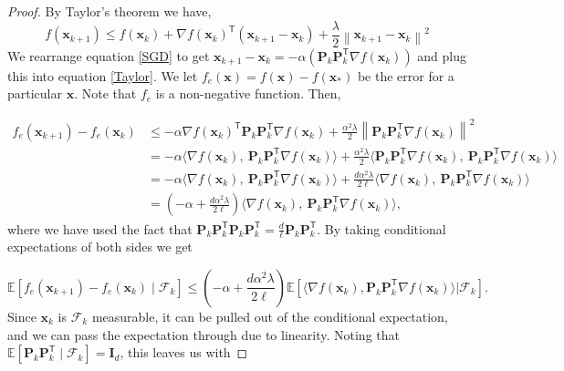 \documentclass[11pt] {article}
\newcommand{\norm}[1]{\left\lVert#1\right\rVert}
\newcommand{\x}{\pmb{x}}
\newcommand{\I}{\pmb{I}}
\newcommand{\Expectation}{\mathbb{E}}
\newcommand{\T}{\mathsf{T}}
\begin{document}
\begin{proof}
	By Taylor's theorem we have, 
	\begin{equation}\label{Taylor}
	f(\x_{k+1}) \leq  f(\x_k) + \nabla f(\x_k)^{\T}(\x_{k+1}-\x_k) + \frac{\lambda}{2}\norm{\x_{k+1}-\x_k}^2
	\end{equation}
	We rearrange equation \eqref{SGD} to get $\x_{k+1}-\x_k = -\alpha(\mathbf{P}_k\mathbf{P}_k^{\T}\nabla f(\x_k))$ and plug this into equation \eqref{Taylor}. We let $f_e(\x) = f(\x)-f(\x_*)$ be the error for a particular $\x$.  Note that $f_e$ is a non-negative function. Then,
	
	\begin{align}\label{delineq}
	\nonumber	f_e(\x_{k+1}) - f_e(\x_k)  &\leq - \alpha  \nabla f(\x_k)^{\T}\mathbf{P}_k\mathbf{P}_k^{\T} \nabla f(\x_k) + \frac{\alpha^2\lambda}{2}\norm{\mathbf{P}_k\mathbf{P}_k^{\T} \nabla f(\x_k)}^2\\
	\nonumber	&= -\alpha \langle \nabla f(\x_k),~ \mathbf{P}_k\mathbf{P}_k^{\T}\nabla f(\x_k) \rangle + \frac{\alpha^2\lambda}{2}  \langle  \mathbf{P}_k\mathbf{P}_k^{\T}\nabla f(\x_k),~ \mathbf{P}_k\mathbf{P}_k^{\T}\nabla f(\x_k) \rangle \\
	\nonumber	&= -\alpha \langle \nabla f(\x_k),~ \mathbf{P}_k\mathbf{P}_k^{\T}\nabla f(\x_k) \rangle + \frac{d\alpha^2\lambda}{2\ell}  \langle \nabla f(\x_k),~ \mathbf{P}_k\mathbf{P}_k^{\T}\nabla f(\x_k) \rangle\\
		\nonumber	&= \left(-\alpha +\frac{d\alpha^2\lambda}{2\ell}\right)  \langle \nabla f(\x_k),~ \mathbf{P}_k\mathbf{P}_k^{\T}\nabla f(\x_k) \rangle,
	\end{align}
	where we have used the fact that $\mathbf{P}_k\mathbf{P}_k^{\T}\mathbf{P}_k\mathbf{P}_k^{\T}= \frac{d}{\ell}\mathbf{P}_k\mathbf{P}_k^{\T}$. By taking conditional expectations of both sides we get
	
	\begin{equation*}
	\Expectation \left[f_e(\x_{k+1})-f_e(\x_k) \mid \mathcal{F}_k \right] \leq  \left(-\alpha +\frac{d\alpha^2\lambda}{2\ell}\right) \Expectation \left[ \langle \nabla f(\x_k), \mathbf{P}_k\mathbf{P}_k^{\T} \nabla f(\x_k) \rangle  \bigg| \mathcal{F}_k \right] .
	\end{equation*}
Since $\x_k$ is $\mathcal{F}_k$ measurable, it can be pulled out of the conditional expectation, and we can pass the expectation through due to linearity. Noting that $\Expectation \left[\mathbf{P}_k\mathbf{P}_k^{\T} \mid \mathcal{F}_k \right]=\I_d$,  this leaves us with
	

\end{proof}
\end{document}
